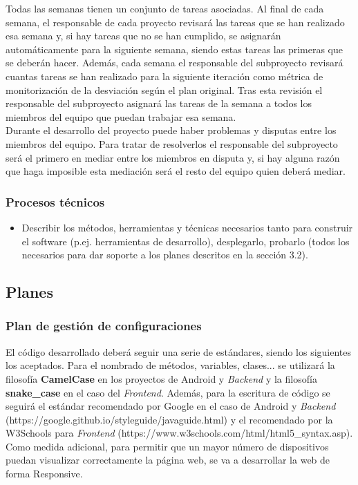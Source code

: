 \documentclass[12pt]{article}%
\begin{document}
Todas las semanas tienen un conjunto de tareas asociadas. Al final de cada semana, el responsable de cada proyecto revisar\'a las tareas que se han realizado esa semana y, si hay tareas que no se han cumplido, se asignar\'an autom\'aticamente para la siguiente semana, siendo estas tareas las primeras que se deber\'an hacer. Adem\'as, cada semana el responsable del subproyecto revisar\'a cuantas tareas se han realizado para la siguiente iteraci\'on  como m\'etrica de monitorizaci\'on de la desviaci\'on seg\'un el plan original. Tras esta revisi\'on el responsable del subproyecto asignar\'a las tareas de la semana a todos los miembros del equipo que puedan trabajar esa semana. \\

Durante el desarrollo del proyecto puede haber problemas y disputas entre los miembros del equipo. Para tratar de resolverlos el responsable del subproyecto ser\'a el primero en mediar entre los miembros en disputa y, si hay alguna raz\'on que haga imposible esta mediaci\'on ser\'a el resto del equipo quien deber\'a mediar. \\

\subsubsection{Procesos t\'ecnicos}
\begin{itemize}
	\item Describir los m\'etodos, herramientas y t\'ecnicas necesarios tanto para construir el software (p.ej. herramientas de desarrollo), desplegarlo, probarlo (todos los necesarios para dar soporte a los planes descritos en la secci\'on 3.2).\\
\end{itemize}

\subsection{Planes}
\subsubsection{Plan de gesti\'on de configuraciones}

El c\'odigo desarrollado deber\'a seguir una serie de est\'andares, siendo los siguientes los aceptados. Para el nombrado de m\'etodos, variables, clases... se utilizar\'a la filosof\'ia \textbf{CamelCase} en los proyectos de Android y \textit{Backend} y la filosof\'ia \textbf{snake\_case} en el caso del \textit{Frontend}. Adem\'as, para la escritura de c\'odigo se seguir\'a el est\'andar recomendado por Google en el caso de Android y \textit{Backend} (https://google.github.io/styleguide/javaguide.html) y el recomendado por la W3Schools para \textit{Frontend} (https://www.w3schools.com/html/html5\_syntax.asp). Como medida adicional, para permitir que un mayor n\'umero de dispositivos puedan visualizar correctamente la p\'agina web, se va a desarrollar la web de forma Responsive.\\
\end{document}
